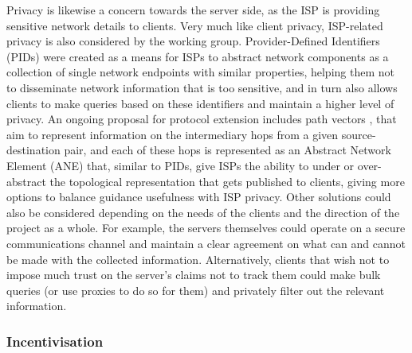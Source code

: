     Privacy is likewise a concern towards the server side, as the ISP is providing sensitive network details to clients.
    Very much like client privacy, ISP-related privacy is also considered by the working group.
    Provider-Defined Identifiers (PIDs) were created as a means for ISPs to abstract network components as a collection of single network endpoints with similar properties, helping them not to disseminate network information that is too sensitive, and in turn also allows clients to make queries based on these identifiers and maintain a higher level of privacy.
    An ongoing proposal for protocol extension includes path vectors \cite{alto-path-vector}, that aim to represent information on the intermediary hops from a given source-destination pair, and each of these hops is represented as an Abstract Network Element (ANE) that, similar to PIDs, give ISPs the ability to under or over-abstract the topological representation that gets published to clients, giving more options to balance guidance usefulness with ISP privacy.
    Other solutions could also be considered depending on the needs of the clients and the direction of the project as a whole.
    For example, the servers themselves could operate on a secure communications channel and maintain a clear agreement on what can and cannot be made with the collected information.
    Alternatively, clients that wish not to impose much trust on the server's claims not to track them could make bulk queries (or use proxies to do so for them) and privately filter out the relevant information.

\subsubsection{Incentivisation}

